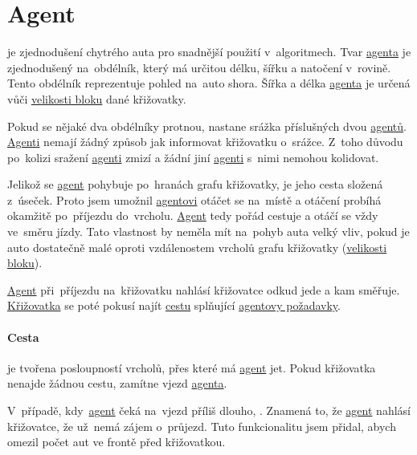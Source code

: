 \section{Agent}\label{sec:agent}



 je zjednodušení chytrého auta pro snadnější použití v~algoritmech.
Tvar \hyperref[sec:agent]{agenta} je zjednodušený na~obdélník, který má určitou délku, šířku a natočení v~rovině.
Tento obdélník reprezentuje pohled na~auto shora.
Šířka a délka \hyperref[sec:agent]{agenta} je určená vůči \hyperref[par:velikost_bloku]{velikosti bloku} dané křižovatky.

Pokud se nějaké dva obdélníky protnou, nastane srážka příslušných dvou \hyperref[sec:agent]{agentů}.
\hyperref[sec:agent]{Agenti} nemají žádný způsob jak informovat křižovatku o~srážce.
Z~toho důvodu po~kolizi sražení \hyperref[sec:agent]{agenti} zmizí
a žádní jiní \hyperref[sec:agent]{agenti} s~nimi nemohou kolidovat.

Jelikož se \hyperref[sec:agent]{agent} pohybuje po~hranách grafu křižovatky, je jeho cesta složená z~úseček.
Proto jsem umožnil \hyperref[sec:agent]{agentovi} otáčet se na~místě a otáčení probíhá okamžitě po~příjezdu do~vrcholu.
\hyperref[sec:agent]{Agent} tedy pořád cestuje a otáčí se vždy ve~směru jízdy.
Tato vlastnost by neměla mít na~pohyb auta velký vliv, pokud je auto dostatečně malé
oproti vzdálenostem vrcholů grafu křižovatky (\hyperref[par:velikost_bloku]{velikosti bloku}).

\hyperref[sec:agent]{Agent} při~příjezdu na~křižovatku nahlásí křižovatce odkud jede a kam směřuje.
\hyperref[sec:krizovatka]{Křižovatka} se poté pokusí najít \hyperref[par:cesta]{cestu} splňující \hyperref[sec:agent]{agentovy požadavky}.

\paragraph{Cesta}\label{par:cesta} je tvořena posloupností vrcholů, přes které má \hyperref[sec:agent]{agent} jet.
Pokud křižovatka nenajde žádnou cestu, zamítne vjezd \hyperref[sec:agent]{agenta}.

V~případě, kdy~\hyperref[sec:agent]{agent} čeká na~vjezd příliš dlouho,
.
Znamená to, že \hyperref[sec:agent]{agent} nahlásí křižovatce, že už~nemá zájem o~průjezd.
Tuto funkcionalitu jsem přidal, abych omezil počet aut ve frontě před křižovatkou.
